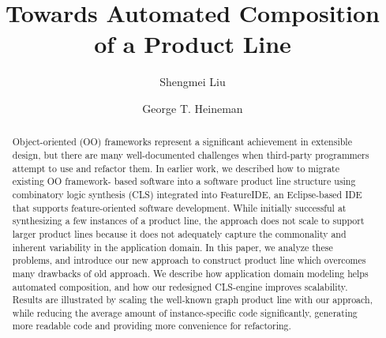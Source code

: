 \documentclass[sigconf]{acmart}
\begin{document}
%
\title{Towards Automated Composition of a Product Line}

%
\author{Shengmei Liu}

\author{George T. Heineman}

%

%
\begin{abstract}
Object-oriented (OO) frameworks represent a significant achievement in extensible design,
but there are many well-documented challenges when third-party programmers attempt to use and
refactor them. In earlier work, we described how to migrate existing OO framework- based software
into a software product line structure using combinatory logic synthesis (CLS) integrated into FeatureIDE,
an Eclipse-based IDE that supports feature-oriented software development. While initially successful at
synthesizing a few instances of a product line, the approach does not scale to support larger product
lines because it does not adequately capture the commonality and inherent variability in the application domain.
In this paper, we analyze these problems, and introduce our new approach to construct product line which
overcomes many drawbacks of old approach. We describe how application domain modeling helps automated
composition, and how our redesigned CLS-engine improves scalability. Results are illustrated by scaling
the well-known graph product line with our approach, while reducing the average amount of instance-specific
code significantly, generating more readable code and providing more convenience for refactoring.
\end{abstract}
\end{document}
